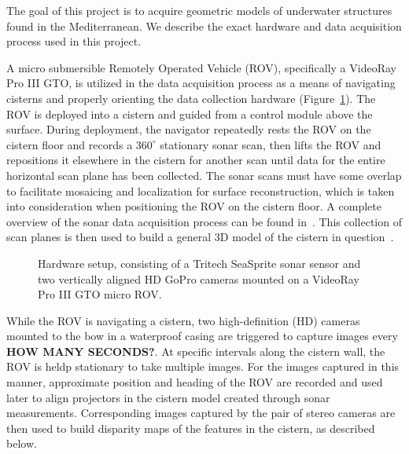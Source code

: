 \documentclass[a4paper,twoside]{article}
\begin{document}
\noindent The goal of this project is to acquire geometric models of underwater structures found in the Mediterranean.  We describe the exact hardware and data acquisition process used in this project.

A micro submersible Remotely Operated Vehicle (ROV), specifically a VideoRay Pro III GTO, is utilized in the data acquisition process as a means of navigating cisterns and properly orienting the data collection hardware (Figure~\ref{fig:ROV}). The ROV is deployed into a cistern and guided from a control module above the surface. During deployment, the navigator repeatedly rests the ROV on the cistern floor and records a $360^{\circ}$ stationary sonar scan, then lifts the ROV and repositions it elsewhere in the cistern for another scan until data for the entire horizontal scan plane has been collected. The sonar scans must have some overlap to facilitate mosaicing and localization for surface reconstruction, which is taken into consideration when positioning the ROV on the cistern floor. A complete overview of the sonar data acquisition process can be found in~\cite{ClarkVast}.  This collection of scan planes is then used to build a general 3D model of the cistern in question~\cite{ICEX11}.
  
\begin{figure}[!h]
   \vspace{-0.2cm}
   \caption{Hardware setup, consisting of a Tritech SeaSprite sonar sensor and two vertically aligned HD GoPro cameras mounted on a VideoRay Pro III GTO micro ROV.}
  \label{fig:ROV}
 \end{figure}

While the ROV is navigating a cistern, two high-definition (HD) cameras mounted to the bow in a waterproof casing are triggered to capture images every \textbf{HOW MANY SECONDS?}. At specific intervals along the cistern wall, the ROV is heldp stationary to take multiple images.
For the images captured in this manner, approximate position and heading of the ROV are recorded and used later to align projectors in the cistern model created through sonar measurements. Corresponding images captured by the pair of stereo cameras are then used to build disparity maps of the features in the cistern, as described below.

\end{document}
